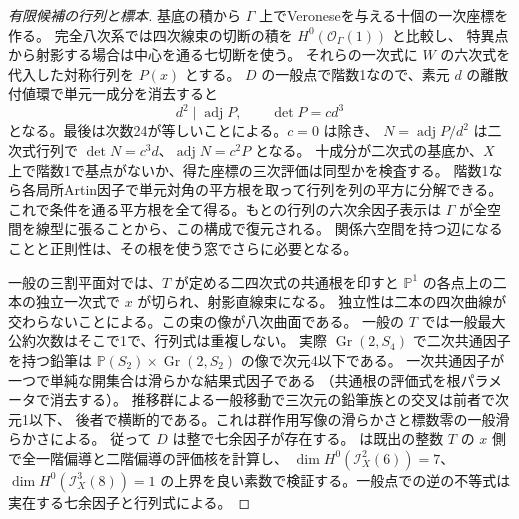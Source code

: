 \begin{proof}[有限候補の行列と標本]
基底の積から $\Gamma$ 上でVeroneseを与える十個の一次座標を作る。
完全八次系では四次線束の切断の積を $H^0(\mathcal O_\Gamma(1))$ と比較し、
特異点から射影する場合は中心を通る七切断を使う。
それらの一次式に $W$ の六次式を代入した対称行列を $P(x)$ とする。
$D$ の一般点で階数1なので、素元 $d$ の離散付値環で単元一成分を消去すると
\[
       d^2\mid\operatorname{adj}P,\qquad \det P=c d^3
\]
となる。最後は次数24が等しいことによる。$c=0$ は除き、
$N=\operatorname{adj}P/d^2$ は二次式行列で
$\det N=c^3d$、$\operatorname{adj}N=c^2 P$ となる。
十成分が二次式の基底か、$X$ 上で階数1で基点がないか、得た座標の三次評価は同型かを検査する。
階数1なら各局所Artin因子で単元対角の平方根を取って行列を列の平方に分解できる。
これで条件を通る平方根を全て得る。もとの行列の六次余因子表示は
$\Gamma$ が全空間を線型に張ることから、この構成で復元される。
関係六空間を持つ辺になることと正則性は、その根を使う窓でさらに必要となる。

一般の三割平面対では、$T$ が定める二四次式の共通根を印すと
$\mathbb P^1$ の各点上の二本の独立一次式で $x$ が切られ、射影直線束になる。
独立性は二本の四次曲線が交わらないことによる。この束の像が八次曲面である。
一般の $T$ では一般最大公約次数はそこで1で、行列式は重複しない。
実際 $\operatorname{Gr}(2,S_4)$ で二次共通因子を持つ鉛筆は
$\mathbb P(S_2)\times\operatorname{Gr}(2,S_2)$ の像で次元4以下である。
一次共通因子が一つで単純な開集合は滑らかな結果式因子である
（共通根の評価式を根パラメータで消去する）。
推移群による一般移動で三次元の鉛筆族との交叉は前者で次元1以下、
後者で横断的である。これは群作用写像の滑らかさと標数零の一般滑らかさによる。
従って $D$ は整で七余因子が存在する。
 は既出の整数 $T$ の
$x$ 側で全一階偏導と二階偏導の評価核を計算し、
$\dim H^0(\mathcal I_X^2(6))=7$、$\dim H^0(\mathcal I_X^3(8))=1$
の上界を良い素数で検証する。一般点での逆の不等式は実在する七余因子と行列式による。
\end{proof}

